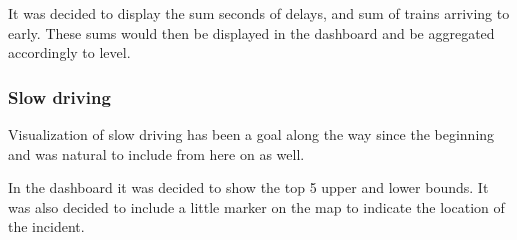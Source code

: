 It was decided to display the sum seconds of delays, and sum of trains
arriving to early. These sums would then be displayed in the dashboard and be
aggregated accordingly to level.


\subsubsection{Slow driving} %
\label{ssub:slow_driving}
Visualization of slow driving has been a goal along the way since the beginning
and was natural to include from here on as well.

In the dashboard it was decided to show the top 5 upper and lower bounds.
It was also decided to include a little marker on the map to indicate the
location of the incident.




